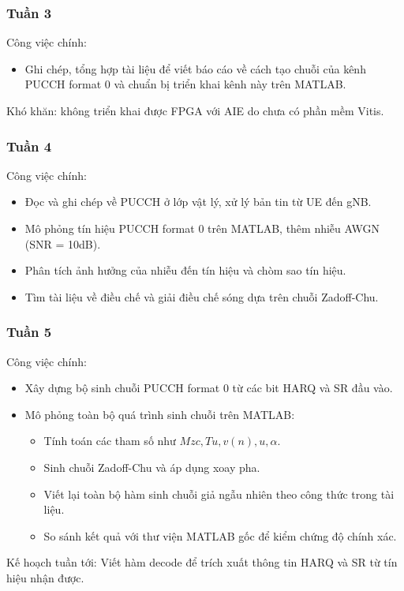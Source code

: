 \documentclass[13pt]{report}
\begin{document}
\subsubsection{Tuần 3}
Công việc chính: 
\begin{itemize}
    \item Ghi chép, tổng hợp tài liệu để viết báo cáo về cách tạo chuỗi của kênh PUCCH format 0 và chuẩn bị triển khai kênh này trên MATLAB.
\end{itemize}
Khó khăn: không triển khai được FPGA với AIE do chưa có phần mềm Vitis.

\subsubsection{Tuần 4}
Công việc chính:
\begin{itemize}
    \item Đọc và ghi chép về PUCCH ở lớp vật lý, xử lý bản tin từ UE đến gNB.
    \item Mô phỏng tín hiệu PUCCH format 0 trên MATLAB, thêm nhiễu AWGN (SNR = 10dB).
    \item Phân tích ảnh hưởng của nhiễu đến tín hiệu và chòm sao tín hiệu.
    \item Tìm tài liệu về điều chế và giải điều chế sóng dựa trên chuỗi Zadoff-Chu.
\end{itemize}
\subsubsection{Tuần 5}
Công việc chính:
\begin{itemize}
    \item Xây dựng bộ sinh chuỗi PUCCH format 0 từ các bit HARQ và SR đầu vào.
    \item Mô phỏng toàn bộ quá trình sinh chuỗi trên MATLAB:\begin{itemize}
        \item Tính toán các tham số như $Mzc, Tu,v(n), u, \alpha.$
        \item Sinh chuỗi Zadoff-Chu và áp dụng xoay pha.
        \item Viết lại toàn bộ hàm sinh chuỗi giả ngẫu nhiên theo công thức trong tài liệu.
        \item So sánh kết quả với thư viện MATLAB gốc để kiểm chứng độ chính xác.
    \end{itemize}
\end{itemize}

Kế hoạch tuần tới: Viết hàm decode để trích xuất thông tin HARQ và SR từ tín hiệu nhận được.
\end{document}
